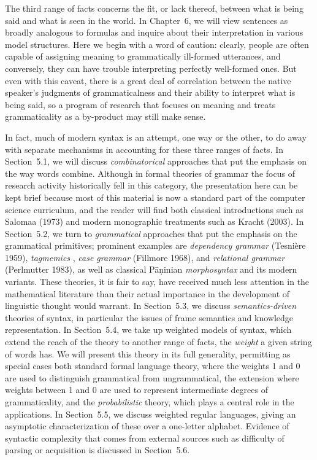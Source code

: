 The third range of facts concerns the fit, or lack thereof, between what is
being said and what is seen in the world. In Chapter~6, we will view sentences
as broadly analogous to formulas and inquire about their interpretation in
various model structures. Here we begin with a word of caution: clearly,
people are often capable of assigning meaning to grammatically ill-formed
utterances, and conversely, they can have trouble interpreting perfectly
well-formed ones. But even with this caveat, there is a great deal of
correlation between the native speaker's judgments of grammaticalness and
their ability to interpret what is being said, so a program of research that
focuses on meaning and treats grammaticality as a by-product may still make
sense.

In fact, much of modern syntax is an attempt, one way or the other, to do away
with separate mechanisms in accounting for these three ranges of facts.  In
Section~5.1, we will discuss {\it combinatorical} approaches that put the
emphasis on the way words combine. Although in formal theories of grammar the
focus of research activity historically fell in this category, the
presentation here can be kept brief because most of this material is now a
standard part of the computer science curriculum, and the reader will find
both classical introductions such as Salomaa (1973) and modern monographic
treatments such as Kracht (2003).  In Section~5.2, we turn to {\it
  grammatical} approaches that put the emphasis on the grammatical primitives;
prominent examples are {\it dependency grammar} (Tesni\`ere 1959),
\nocite{Tesnie1re:1959} {\it tagmemics} \cite{Brend:1976}, {\it case grammar}
(Fillmore 1968), and {\it relational grammar} (Perlmutter 1983), as well as
classical P\={a}\d{n}inian {\it morphosyntax} and its modern variants. These
theories, it is fair to say, have received much less attention in the
mathematical literature than their actual importance in the development of
linguistic thought would warrant.  In Section~5.3, we discuss {\it
  semantics-driven} theories of syntax, in particular the issues of frame
semantics and knowledge representation. In Section~5.4, we take up weighted
models of syntax, which extend the reach of the theory to another range of
facts, the {\it weight} a given string of words has. We will present this
theory in its full generality, permitting as special cases both standard
formal language theory, where the weights 1 and 0 are used to distinguish
grammatical from ungrammatical, the extension \cite{Chomsky:1967} where
weights between 1 and 0 are used to represent intermediate degrees of
grammaticality, and the {\it probabilistic} theory, which plays a central role
in the applications. In Section~5.5, we discuss weighted regular languages,
giving an asymptotic characterization of these over a one-letter
alphabet. Evidence of syntactic complexity that comes from external sources
such as difficulty of parsing or acquisition is discussed in Section~5.6.

